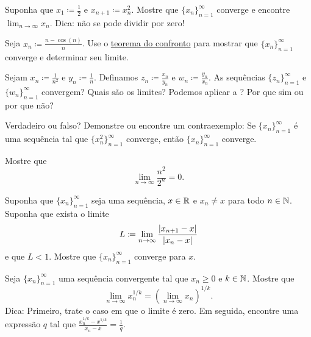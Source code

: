 \begin{exercise}
Suponha que $x_1 \coloneqq \frac{1}{2}$ e $x_{n+1} \coloneqq x_n^2$. Mostre que
$\{ x_n \}_{n=1}^\infty$ converge e encontre
$\lim_{n\to\infty} x_n$. Dica: não se pode dividir por zero!
\end{exercise}

\begin{exercise}
Seja $x_n \coloneqq \frac{n-\cos(n)}{n}$. Use o
\hyperref[squeeze:lemma]{teorema do confronto} para mostrar que
$\{ x_n \}_{n=1}^\infty$ converge e determinar seu limite.
\end{exercise}

\begin{exercise}
Sejam $x_n \coloneqq \frac{1}{n^2}$ e $y_n \coloneqq \frac{1}{n}$. Definamos
$z_n \coloneqq \frac{x_n}{y_n}$ e
$w_n \coloneqq \frac{y_n}{x_n}$. As sequências $\{ z_n \}_{n=1}^\infty$ e $\{ w_n \}_{n=1}^\infty$
convergem? Quais são os limites? Podemos aplicar a ?
Por que sim ou por que não?
\end{exercise}

\begin{exercise}
Verdadeiro ou falso? Demonstre ou encontre um contraexemplo:
Se $\{ x_n \}_{n=1}^\infty$ é uma sequência
tal que $\{ x_n^2 \}_{n=1}^\infty$ converge, então $\{ x_n \}_{n=1}^\infty$ converge.
\end{exercise}

\begin{exercise}
Mostre que
\begin{equation*}
\lim_{n\to\infty} \frac{n^2}{2^n} = 0 .
\end{equation*}
\end{exercise}

\begin{exercise}
Suponha que $\{ x_n \}_{n=1}^\infty$ seja uma sequência, $x \in {\mathbb{R}}$ e $x_n \neq x$ para
todo $n \in {\mathbb{N}}$. Suponha que exista o limite
\begin{equation*}
L \coloneqq \lim_{n \to \infty} \frac{\lvert {x_{n+1}-x} \rvert}{\lvert {x_n-x} \rvert}
\end{equation*}
e que $L < 1$. Mostre que $\{ x_n \}_{n=1}^\infty$ converge para $x$.
\end{exercise}

\begin{exercise}[Desafiador]
Seja $\{ x_n \}_{n=1}^\infty$ uma sequência convergente tal
que $x_n \geq 0$ e $k \in {\mathbb{N}}$.
Mostre que
\begin{equation*}
\lim_{n\to\infty} x_n^{1/k} =
{\left( \lim_{n\to\infty} x_n \right)}^{1/k} .
\end{equation*}
Dica: Primeiro, trate o caso em que o limite é zero.
Em seguida, encontre uma expressão $q$ tal que
$\frac{x_n^{1/k}-x^{1/k}}{x_n-x} =
\frac{1}{q}$.
\end{exercise}

